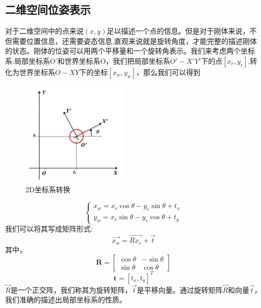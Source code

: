 \subsection{二维空间位姿表示}
对于二维空间中的点来说$(x,y)$足以描述一个点的信息。但是对于刚体来说，不但需要位置信息，还需要姿态信息,直观来说就是旋转角度，才能完整的描述刚体的状态。刚体的位姿可以用两个平移量和一个旋转角表示。我们来考虑两个坐标系:局部坐标系O'和世界坐标系O，我们把局部坐标系$O'-X'Y'$下的点$[x_r,y_r]$,转化为世界坐标系$O-XY$下的坐标$[x_w,y_w]$，那么我们可以得到
\begin{figure}
	\centering
	\includegraphics[height=5cm]{figures/2DCoordinate.png}
	\caption{2D坐标系转换}
\end{figure}
\begin{equation}
\left\{\begin{array}{l}{x_{w}=x_{r} \cos \theta-y_{r} \sin \theta+t_{x}} \\ {y_{w}=x_{r} \sin \theta-y_{r} \cos \theta+t_{y}}\end{array}\right.
\end{equation}
我们可以将其写成矩阵形式:
\begin{equation}
\vec{x_{w}}=\vec{R x_{r}}+\vec{t}\label{2dtranslate matrix}
\end{equation}
其中，
\begin{equation}
\mathbf{R}=\left[ \begin{array}{cc}{\cos \theta} & {-\sin \theta} \\ {\sin \theta} & {\cos \theta}\end{array}\right]
\end{equation}
\begin{equation}
\mathbf{t}=\left[t_{x}, t_{y}\right]^{T}
\end{equation}
$\vec R$是一个正交阵，我们称其为旋转矩阵，$\vec t$是平移向量。通过旋转矩阵$\vec{R}$和向量$\vec{t}$，我们准确的描述出局部坐标系的性质。
